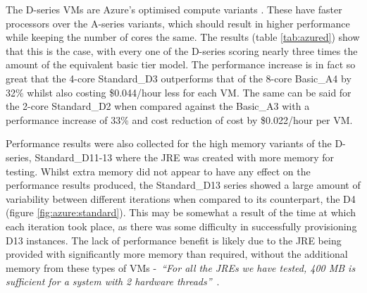 \documentclass{entcs} \usepackage{entcsmacro}
\begin{document}
The D-series VMs are Azure's optimised compute variants \cite{azurevmtype}. These have faster processors over the A-series variants, which should result in higher performance while keeping the number of cores the same. The results (table \ref{tab:azured}) show that this is the case, with every one of the D-series scoring nearly three times the amount of the equivalent basic tier model. The performance increase is in fact so great that the 4-core Standard\_D3 outperforms that of the 8-core Basic\_A4 by 32\% whilst also costing \$0.044/hour less for each VM. The same can be said for the 2-core Standard\_D2 when compared against the Basic\_A3 with a performance increase of 33\% and cost reduction of cost by \$0.022/hour per VM.

Performance results were also collected for the high memory variants of the D-series, Standard\_D11-13 where the JRE was created with more memory for testing. Whilst extra memory did not appear to have any effect on the performance results produced, the Standard\_D13 series showed a large amount of variability between different iterations when compared to its counterpart, the D4 (figure \ref{fig:azure:standard}). This may be somewhat a result of the time at which each iteration took place, as there was some difficulty in successfully provisioning D13 instances. The lack of performance benefit is likely due to the JRE being provided with significantly more memory than required, without the additional memory from these types of VMs -~\emph{``For all the JREs we have tested, 400 MB is sufficient for a system with 2 hardware threads''}~\cite{specjvmguide}.
\end{document}
